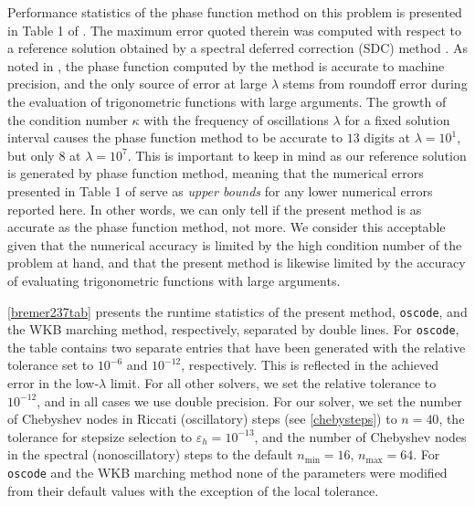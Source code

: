 \documentclass[10pt]{article}
\begin{document}
Performance statistics of the phase function method on this problem is presented in
Table 1 of \cite{bremer2018}. The maximum error quoted therein was computed
with respect to a reference solution obtained by a spectral deferred correction
(SDC) method \cite{dutt2000}. As noted in \cite{bremer2018}, the phase function
computed by the method is accurate to machine precision, and the only source of
error at large $\lambda$ stems from roundoff error during the evaluation of
trigonometric functions with large arguments. The growth of the condition number $\kappa$ with the frequency of oscillations $\lambda$ for a fixed solution interval causes the phase function method to
be accurate to $13$ digits at $\lambda = 10^1$, but only $8$  at $\lambda =
10^7$. This is important to keep in mind as our reference solution is generated
by phase function method, meaning that the numerical errors presented in Table
1 of \cite{bremer2018} serve as \emph{upper bounds} for any lower numerical
errors reported here. In other words, we can only tell if the present method is
as accurate as the phase function method, not more. We consider this acceptable
given that the numerical accuracy is limited by the high condition number of
the problem at hand, and that the present method is likewise limited by
the accuracy of evaluating trigonometric functions with large arguments.

\cref{bremer237tab} presents the runtime statistics of the present method,
\texttt{oscode}, and the WKB marching method, respectively, separated by double
lines. For \texttt{oscode}, the table contains two separate entries that have
been generated with the relative tolerance set to $10^{-6}$ and $10^{-12}$,
respectively. This is reflected in the achieved error in the low-$\lambda$
limit. For all other solvers, we set the relative tolerance to $10^{-12}$, and
in all cases we use double precision. For our solver, we set the number of
Chebyshev nodes in Riccati (oscillatory) steps (see \cref{chebysteps}) to $n = 40$, the
tolerance for stepsize selection to $\varepsilon_h = 10^{-13}$, and the number
of Chebyshev nodes in the spectral (nonoscillatory) steps to the default
$n_{\text{min}} = 16$, $n_{\text{max}} = 64$. For \texttt{oscode} and the WKB
marching method none of the parameters were modified from their default values
with the exception of the local tolerance.
\end{document}
